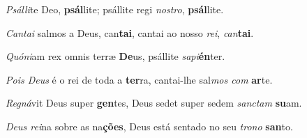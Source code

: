 \begin{greenumerate}
  \setcounter{enumi}{1}


  \item \textit{Psálli}te Deo, \textbf{psál}lite; {\GreStar} psállite regi \textit{nostro}, \textbf{psál}lite. 

  \switchcolumn\setcounter{enumi}{1}

  \item \textit{Cantai} salmos a Deus, can\textbf{tai}, {\GreStar} cantai ao nosso \textit{rei}, \textit{can}\textbf{tai}. 

  \switchcolumn*


  \item \textit{Quóni}am rex omnis terræ \textbf{De}us, {\GreStar} psállite \textit{sapi}\textbf{én}ter. 

  \switchcolumn%

  \item \textit{Pois Deus} é o rei de toda a \textbf{ter}ra, {\GreStar} cantai-lhe sal\textit{mos com} \textbf{ar}te. 

  \switchcolumn*


  \item \textit{Regná}vit Deus super \textbf{gen}tes, {\GreStar} Deus sedet super sedem \textit{sanctam} \textbf{su}am. 

  \switchcolumn%

  \item \textit{Deus rei}na sobre as na\textbf{ções}, {\GreStar} Deus está sentado no seu \textit{trono} \textbf{san}to. 
\end{greenumerate}